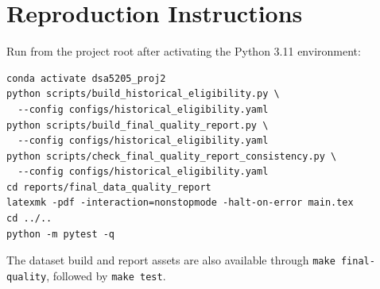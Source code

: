 \section{Reproduction Instructions}

Run from the project root after activating the Python 3.11 environment:

\begin{verbatim}
conda activate dsa5205_proj2
python scripts/build_historical_eligibility.py \
  --config configs/historical_eligibility.yaml
python scripts/build_final_quality_report.py \
  --config configs/historical_eligibility.yaml
python scripts/check_final_quality_report_consistency.py \
  --config configs/historical_eligibility.yaml
cd reports/final_data_quality_report
latexmk -pdf -interaction=nonstopmode -halt-on-error main.tex
cd ../..
python -m pytest -q
\end{verbatim}

The dataset build and report assets are also available through
\texttt{make final-quality}, followed by \texttt{make test}.
